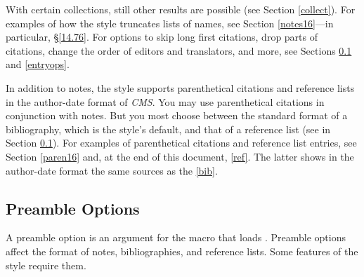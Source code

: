 \documentclass[11pt,letterpaper,oneside]{article}
\begin{document}
With certain collections, still other results are possible (see
Section \ref{collect}). For examples of how the style truncates lists
of names, see Section \ref{notes16}---in particular, \S\ref{14.76}.
For options to skip long first citations, drop parts of citations,
change the order of editors and translators, and more, see Sections
\ref{preops} and \ref{entryops}.

In addition to notes, the style supports parenthetical citations and
reference lists in the author-date format of \textit{CMS}. You may use
parenthetical citations in conjunction with notes. But you most choose
between the standard format of a bibliography, which is the style's
default, and that of a reference list (see  in Section
\ref{preops}). For examples of parenthetical citations and reference
list entries, see Section \ref{paren16} and, at the end of this
document, \ref{ref}. The latter shows in the author-date format the
same sources as the \ref{bib}.

\subsection{Preamble Options}
\label{preops}

A preamble option is an argument for the  macro that
loads \biblatex. Preamble options affect the format of notes,
bibliographies, and reference lists. Some features of the style
require them.
\end{document}
